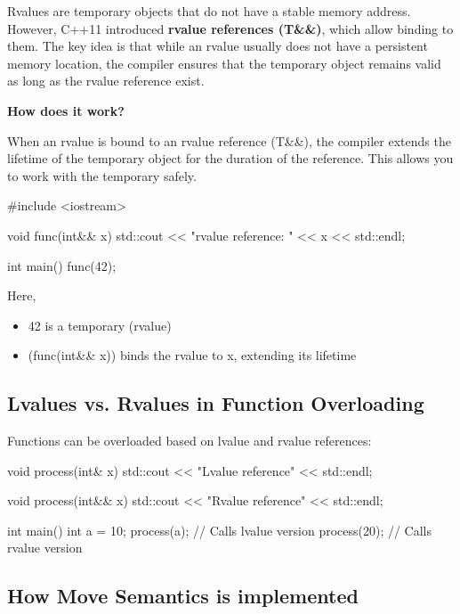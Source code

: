 \begin{observationblock}
    Rvalues are temporary objects that do not have a stable memory address. However, C++11 introduced 
    \textbf{rvalue references (T\&\&)}, which allow binding to them. The key idea 
    is that while an rvalue usually does not have a persistent memory location, the compiler 
    ensures that the temporary object remains valid as long as the rvalue reference exist. 

    \textbf{How does it work?}

    When an rvalue is bound to an rvalue reference (T\&\&), the compiler extends the lifetime of the temporary object for the duration of 
    the reference. This allows you to work with the temporary safely. 

    \begin{codeblock}[language=C++]
        #include <iostream> 

        void func(int&& x) {
            std::cout << "rvalue reference: " << x << std::endl;
        }

        int main() {
            func(42);
        }
    \end{codeblock}

    Here, 
    \begin{itemize}
        \item 42 is a temporary (rvalue)
        \item \plaintt(func(int\&\& x)) binds the rvalue to x, extending its lifetime
    \end{itemize}
\end{observationblock}

\subsection*{Lvalues vs. Rvalues in Function Overloading}
Functions can be overloaded based on lvalue and rvalue references:
\begin{codeblock}[language=C++]
void process(int& x) {
    std::cout << "Lvalue reference" << std::endl;
}

void process(int&& x) {
    std::cout << "Rvalue reference" << std::endl;
}

int main() {
    int a = 10;
    process(a);   // Calls lvalue version
    process(20);  // Calls rvalue version
}
\end{codeblock}


\subsection{How Move Semantics is implemented}

